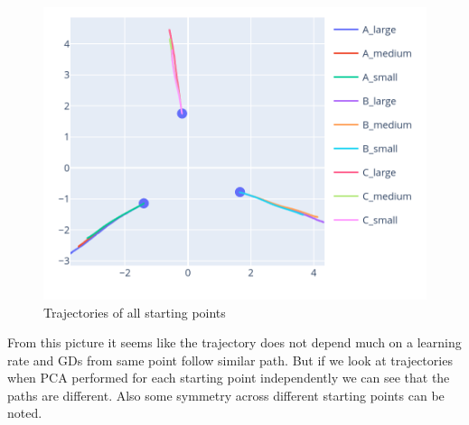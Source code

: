\documentclass{article}
\theoremstyle{definition}
\begin{document}
\begin{figure}[H]
    \begin{center}
        \caption{Trajectories of all starting points}
        \includegraphics[scale=0.3]{pca_all_strategies.png}        
    \end{center}
\end{figure}

From this picture it seems like the trajectory does not depend much 
on a learning rate and GDs from same point follow similar path. 
But if we look at trajectories when PCA performed for each starting point independently 
we can see that the paths are different. 
Also some symmetry across different starting points can be noted. 
\end{document}
